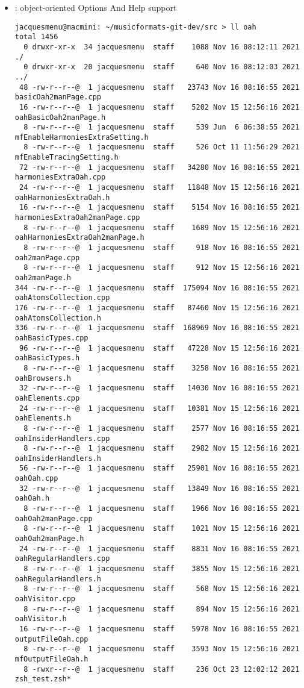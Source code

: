 \begin{itemize}
\item {} : object-oriented Options And Help support
\begin{lstlisting}[language=Terminal]
jacquesmenu@macmini: ~/musicformats-git-dev/src > ll oah
total 1456
  0 drwxr-xr-x  34 jacquesmenu  staff    1088 Nov 16 08:12:11 2021 ./
  0 drwxr-xr-x  20 jacquesmenu  staff     640 Nov 16 08:12:03 2021 ../
 48 -rw-r--r--@  1 jacquesmenu  staff   23743 Nov 16 08:16:55 2021 basicOah2manPage.cpp
 16 -rw-r--r--@  1 jacquesmenu  staff    5202 Nov 15 12:56:16 2021 oahBasicOah2manPage.h
  8 -rw-r--r--@  1 jacquesmenu  staff     539 Jun  6 06:38:55 2021 mfEnableHarmoniesExtraSetting.h
  8 -rw-r--r--@  1 jacquesmenu  staff     526 Oct 11 11:56:29 2021 mfEnableTracingSetting.h
 72 -rw-r--r--@  1 jacquesmenu  staff   34280 Nov 16 08:16:55 2021 harmoniesExtraOah.cpp
 24 -rw-r--r--@  1 jacquesmenu  staff   11848 Nov 15 12:56:16 2021 oahHarmoniesExtraOah.h
 16 -rw-r--r--@  1 jacquesmenu  staff    5154 Nov 16 08:16:55 2021 harmoniesExtraOah2manPage.cpp
  8 -rw-r--r--@  1 jacquesmenu  staff    1689 Nov 15 12:56:16 2021 oahHarmoniesExtraOah2manPage.h
  8 -rw-r--r--@  1 jacquesmenu  staff     918 Nov 16 08:16:55 2021 oah2manPage.cpp
  8 -rw-r--r--@  1 jacquesmenu  staff     912 Nov 15 12:56:16 2021 oah2manPage.h
344 -rw-r--r--@  1 jacquesmenu  staff  175094 Nov 16 08:16:55 2021 oahAtomsCollection.cpp
176 -rw-r--r--@  1 jacquesmenu  staff   87460 Nov 15 12:56:16 2021 oahAtomsCollection.h
336 -rw-r--r--@  1 jacquesmenu  staff  168969 Nov 16 08:16:55 2021 oahBasicTypes.cpp
 96 -rw-r--r--@  1 jacquesmenu  staff   47228 Nov 15 12:56:16 2021 oahBasicTypes.h
  8 -rw-r--r--@  1 jacquesmenu  staff    3258 Nov 16 08:16:55 2021 oahBrowsers.h
 32 -rw-r--r--@  1 jacquesmenu  staff   14030 Nov 16 08:16:55 2021 oahElements.cpp
 24 -rw-r--r--@  1 jacquesmenu  staff   10381 Nov 15 12:56:16 2021 oahElements.h
  8 -rw-r--r--@  1 jacquesmenu  staff    2577 Nov 16 08:16:55 2021 oahInsiderHandlers.cpp
  8 -rw-r--r--@  1 jacquesmenu  staff    2982 Nov 15 12:56:16 2021 oahInsiderHandlers.h
 56 -rw-r--r--@  1 jacquesmenu  staff   25901 Nov 16 08:16:55 2021 oahOah.cpp
 32 -rw-r--r--@  1 jacquesmenu  staff   13849 Nov 16 08:16:55 2021 oahOah.h
  8 -rw-r--r--@  1 jacquesmenu  staff    1966 Nov 16 08:16:55 2021 oahOah2manPage.cpp
  8 -rw-r--r--@  1 jacquesmenu  staff    1021 Nov 15 12:56:16 2021 oahOah2manPage.h
 24 -rw-r--r--@  1 jacquesmenu  staff    8831 Nov 16 08:16:55 2021 oahRegularHandlers.cpp
  8 -rw-r--r--@  1 jacquesmenu  staff    3855 Nov 15 12:56:16 2021 oahRegularHandlers.h
  8 -rw-r--r--@  1 jacquesmenu  staff     568 Nov 15 12:56:16 2021 oahVisitor.cpp
  8 -rw-r--r--@  1 jacquesmenu  staff     894 Nov 15 12:56:16 2021 oahVisitor.h
 16 -rw-r--r--@  1 jacquesmenu  staff    5978 Nov 16 08:16:55 2021 outputFileOah.cpp
  8 -rw-r--r--@  1 jacquesmenu  staff    3593 Nov 15 12:56:16 2021 mfOutputFileOah.h
  8 -rwxr--r--@  1 jacquesmenu  staff     236 Oct 23 12:02:12 2021 zsh_test.zsh*
\end{lstlisting}


\end{itemize}
